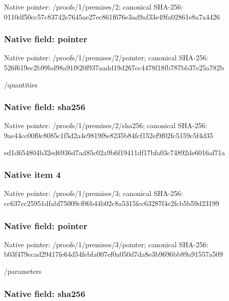 \documentclass[10pt,a4paper]{article}
\begin{document}
Native pointer: /proofs/1/premises/2; canonical SHA-256: 0110df50cc57c83742e7645a\allowbreak{}e27ec861f676e3ad9af33e49\allowbreak{}fa02861e8a7a4426



\subsubsection{Native field: pointer}


Native pointer: /proofs/1/premises/2/pointer; canonical SHA-256: 526f619ec2b99bd98a91f820\allowbreak{}f937aadd19d267cc4478f18f\allowbreak{}b787bb37e25a782b


/quantities


\subsubsection{Native field: sha256}


Native pointer: /proofs/1/premises/2/sha256; canonical SHA-256: 9ae44cc00f0c8085c1f5d2a4\allowbreak{}e9819f8e8235b84fcf152ef9\allowbreak{}f02fc5159c5f4d35


ed1d654804b32ed6936d7ad8\allowbreak{}5c02a9b6f19411df17bfa03c\allowbreak{}74892de6016af71a


\subsubsection{Native item 4}


Native pointer: /proofs/1/premises/3; canonical SHA-256: cc637cc25951dfabf75009cf\allowbreak{}06b44b02c8a5315fcc63287f\allowbreak{}4e2fcb5b59d23199



\subsubsection{Native field: pointer}


Native pointer: /proofs/1/premises/3/pointer; canonical SHA-256: b03f479ecad29417fe64d54f\allowbreak{}ebfa007ef0a050d7da8e3b96\allowbreak{}96bb89a91557a509


/parameters


\subsubsection{Native field: sha256}
\end{document}
